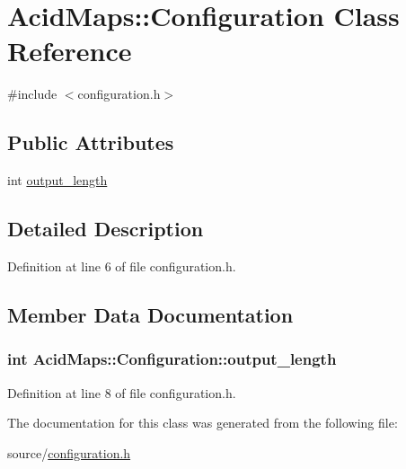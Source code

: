 \hypertarget{class_acid_maps_1_1_configuration}{
\section{AcidMaps::Configuration Class Reference}
\label{class_acid_maps_1_1_configuration}
}


{\ttfamily \#include $<$configuration.h$>$}

\subsection*{Public Attributes}
\begin{DoxyCompactItemize}
\item 
int \hyperlink{class_acid_maps_1_1_configuration_a01e74ee0e2acc5cc0339762a1ecb3397}{output\_\-length}
\end{DoxyCompactItemize}


\subsection{Detailed Description}


Definition at line 6 of file configuration.h.



\subsection{Member Data Documentation}
\hypertarget{class_acid_maps_1_1_configuration_a01e74ee0e2acc5cc0339762a1ecb3397}{
\subsubsection[{output\_\-length}]{\setlength{\rightskip}{0pt plus 5cm}int {\bf AcidMaps::Configuration::output\_\-length}}}
\label{class_acid_maps_1_1_configuration_a01e74ee0e2acc5cc0339762a1ecb3397}


Definition at line 8 of file configuration.h.



The documentation for this class was generated from the following file:\begin{DoxyCompactItemize}
\item 
source/\hyperlink{configuration_8h}{configuration.h}\end{DoxyCompactItemize}
